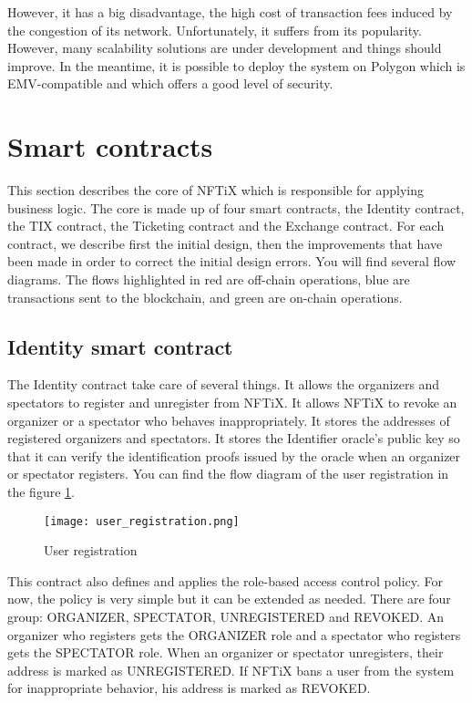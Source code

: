 \documentclass[a4paper,11pt,oneside]{report}
\begin{document}
However, it has a big disadvantage, the high cost of transaction fees induced by the congestion of its network. Unfortunately, it suffers from its popularity. However, many scalability solutions are under development and things should improve. In the meantime, it is possible to deploy the system on Polygon which is EMV-compatible and which offers a good level of security.

\section{Smart contracts}
This section describes the core of NFTiX which is responsible for applying business logic. The core is made up of four smart contracts, the Identity contract, the TIX contract, the Ticketing contract and the Exchange contract. For each contract, we describe first the initial design, then the improvements that have been made in order to correct the initial design errors. You will find several flow diagrams. The flows highlighted in red are off-chain operations, blue are transactions sent to the blockchain, and green are on-chain operations.

\subsection{Identity smart contract}
The Identity contract take care of several things. It allows the organizers and spectators to register and unregister from NFTiX. It allows NFTiX to revoke an organizer or a spectator who behaves inappropriately. It stores the addresses of registered organizers and spectators. It stores the Identifier oracle's public key so that it can verify the identification proofs issued by the oracle when an organizer or spectator registers. You can find the flow diagram of the user registration in the figure  \hyperref[fig:user_registration]{\ref{fig:user_registration}}.

\begin{figure}[h!]
  \texttt{[image: user\_registration.png]}
  \caption{User registration}
  \label{fig:user_registration}
\end{figure}

This contract also defines and applies the role-based access control policy. For now, the policy is very simple but it can be extended as needed. There are four group: ORGANIZER, SPECTATOR, UNREGISTERED and REVOKED. An organizer who registers gets the ORGANIZER role and a spectator who registers gets the SPECTATOR role. When an organizer or spectator unregisters, their address is marked as UNREGISTERED. If NFTiX bans a user from the system for inappropriate behavior, his address is marked as REVOKED.
\end{document}
